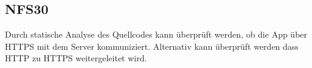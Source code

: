 \subsection*{NFS30}
Durch statische Analyse des Quellcodes kann überprüft werden, ob die App über HTTPS mit dem Server kommuniziert.
Alternativ kann überprüft werden dass HTTP zu HTTPS weitergeleitet wird.